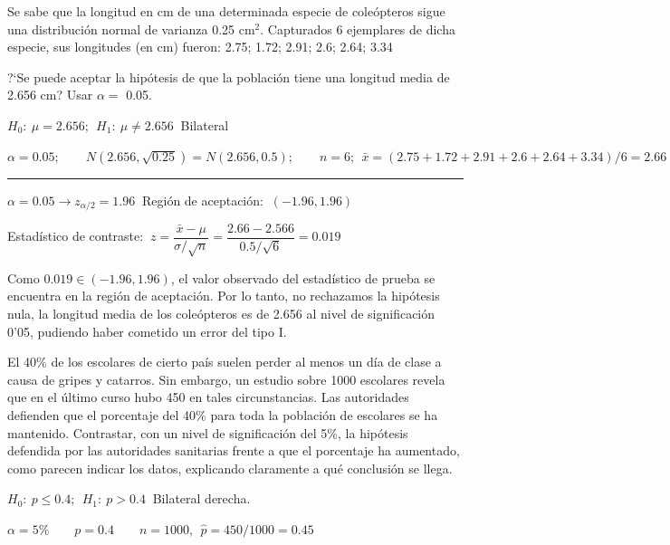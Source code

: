 \vspace{4mm}
\begin{ejemplo}
\begin{ejer}
	Se sabe que la longitud en cm de una determinada especie de coleópteros sigue una distribución normal de varianza 0.25 cm$^2$. Capturados 6 ejemplares de dicha especie, sus longitudes (en cm) fueron: 2.75; 1.72; 2.91; 2.6; 2.64; 3.34

?`Se puede aceptar la hipótesis de que la población tiene una longitud media de 2.656 cm? Usar $\alpha=$ 0.05.
\end{ejer}
\end{ejemplo}

$H_0:\ \mu = 2.656 ; \ \  H_1: \ \mu \neq 2.656\ $ Bilateral

$\alpha=0.05;\qquad N(2.656,\sqrt{0.25})=N(2.656,0.5);\qquad n=6;\ \ \bar x=(2.75 + 1.72 + 2.91 + 2.6 + 2.64 + 3.34)/6=2.66$

\rule{150pt}{0.1pt}

$\alpha=0.05 \to z_{\alpha/2}=1.96\ $ Región de aceptación: $\ (-1.96,1.96)$

Estadístico de contraste: $\ z=\dfrac{\bar x - \mu}{\sigma/\sqrt{n}}=\dfrac{2.66-2.566}{0.5/\sqrt{6}}=0.019$

Como $0.019 \in (-1.96,1.96)$, el valor observado del estadístico de prueba se encuentra en la región de aceptación. Por lo tanto, no rechazamos la hipótesis nula, la longitud media de los coleópteros es
de 2.656 al nivel de significación 0’05, pudiendo haber cometido un error del tipo I.


\vspace{4mm}
\begin{ejemplo}
\begin{ejer}
	El 40\% de los escolares de cierto país suelen perder al menos un día de clase a causa de gripes y catarros. Sin embargo, un estudio sobre 1000 escolares revela que en el último curso hubo 450 en tales circunstancias. Las autoridades defienden que el porcentaje del 40\% para toda la población de escolares se ha mantenido. Contrastar, con un nivel de significación del 5\%, la hipótesis defendida por las autoridades sanitarias frente a que el porcentaje ha aumentado, como parecen indicar los datos, explicando claramente a qué conclusión se llega.
\end{ejer}
\end{ejemplo}

$H_0:\ p\le 0.4;\ \ H_1:\ p>0.4\ $ Bilateral derecha.

$\alpha=5\% \qquad p=0.4\qquad n=1000, \ \ \widehat p=450/1000=0.45$

